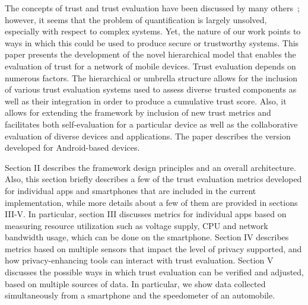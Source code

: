 The concepts of trust and trust evaluation have been discussed by many others~\cite{jing2014riskmon,shabtai2010google,zheng2014droidray}; 
however, it seems that the problem  of quantification is largely unsolved, especially with respect to complex systems.
 Yet, the nature of our work points to ways in which 
this could be used to produce secure or trustworthy systems.  
This paper presents the development of the novel hierarchical model that enables the  evaluation of trust for a 
network of mobile devices. Trust evaluation depends on numerous factors. The hierarchical or umbrella structure allows for the
inclusion of various trust evaluation systems used to assess diverse trusted components as well as their integration 
in order to produce a cumulative trust score. Also, it allows for extending the framework by inclusion of new trust 
metrics and facilitates both self-evaluation for a particular device as well as the collaborative evaluation of 
diverse devices and applications. 
The paper describes the version developed for Android-based devices.

Section II describes the framework design principles and an overall architecture. Also, this section 
 briefly describes a few of the trust evaluation metrics developed for individual apps and
smartphones that are included in the current implementation,
while more details about a few of them are provided in sections III-V. In particular, section III discusses metrics 
for individual apps based on measuring resource utilization such as voltage supply, CPU and network bandwidth usage,
which can be done on the smartphone.
Section IV describes metrics based on multiple sensors that impact the level of privacy supported, and how 
privacy-enhancing tools can interact with trust evaluation.
Section V discusses the possible ways in which trust evaluation can be verified and adjusted, based on multiple sources
of data.  In particular, we show data collected simultaneously from a smartphone and the speedometer of an 
automobile.
